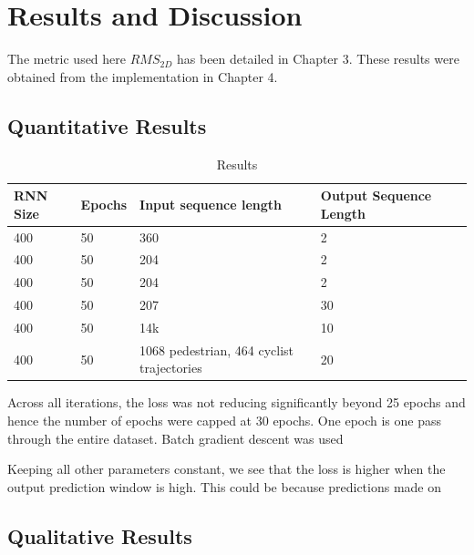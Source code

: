 \chapter{Results and Discussion}

The metric used here \(RMS_{2D}\) has been detailed in Chapter 3. These results were obtained from the implementation in Chapter 4.

\section{Quantitative Results}

\begin{table}[h]
\begin{tabular}{|l|l|l|l|l|}
\hline
RNN Size&Epochs& Input sequence length & Output Sequence Length \\
\hline
400       & 50      & 360      & 2   \\
\hline
400        & 50      & 204      & 2   \\
\hline
400     & 50      & 204          & 2\\
\hline
400    & 50      & 207          & 30\\
\hline
400  & 50      & 14k          & 10\\
\hline
400     & 50 & 1068 pedestrian, 464 cyclist trajectories & 20\\
\hline
\end{tabular}
\caption{Results}
\label{table:results}

\end{table}
Across all iterations, the loss was not reducing significantly beyond 25 epochs and hence the number of epochs were capped at 30 epochs. One epoch is one pass through the entire dataset. Batch gradient descent was used 

Keeping all other parameters constant, we see that the loss is higher when the output prediction window is high. This could be because predictions made on 
\section{Qualitative Results}



